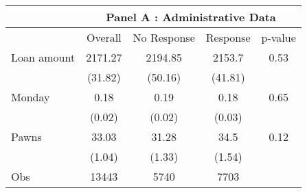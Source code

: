 \begin{tabular}{lcccc}
\toprule
      & \multicolumn{4}{c}{Panel A : Administrative Data} \\
\midrule
\midrule
      & Overall & No Response & Response & p-value \\
\midrule
\midrule
Loan amount  & 2171.27 & 2194.85 & 2153.7 & 0.53 \\
      & (31.82) & (50.16) & (41.81) &  \\
Monday & 0.18  & 0.19  & 0.18  & 0.65 \\
      & (0.02) & (0.02) & (0.03) &  \\
Pawns & 33.03 & 31.28 & 34.5  & 0.12 \\
      & (1.04) & (1.33) & (1.54) &  \\
\midrule
Obs   & 13443 & 5740  & 7703  &  \\
\bottomrule
\bottomrule
\end{tabular}%
